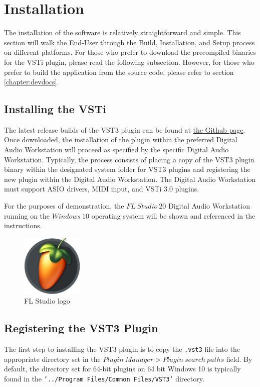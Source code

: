 \documentclass[a4paper,12pt]{report}
\begin{document}
\section{Installation}
\label{sec:installation}
The installation of the software is relatively straightforward and simple. This section will walk the End-User through the Build, Installation, and Setup process on different platforms. For those who prefer to download the precompiled binaries for the VSTi plugin, please read the following subsection. However, for those who prefer to build the application from the source code, please refer to section \ref{chapter:devdocs}.

\subsection{Installing the VSTi}
\label{subsec:installvsti}
The latest release builds of the VST3 plugin can be found at \href{https://github.com/ParadoxChains/C3JI5D-Evan-Sitt-BSc-Thesis/tree/master/Release\%20Builds}{the Github page}. Once downloaded, the installation of the plugin within the preferred Digital Audio Workstation will proceed as specified by the specific Digital Audio Workstation. Typically, the process consists of placing a copy of the VST3 plugin binary within the designated system folder for VST3 plugins and registering the new plugin within the Digital Audio Workstation. The Digital Audio Workstation must support ASIO drivers, MIDI input, and VSTi 3.0 plugins.

For the purposes of demonstration, the $FL\ Studio\ 20$ Digital Audio Workstation running on the $Windows\ 10$ operating system will be shown and referenced in the instructions.

\begin{figure} \centering
\includegraphics[width=8em]{FLStudioLogo.png}
    \caption{FL Studio logo}     \label{fig:FLLogo} \end{figure}

\subsection{Registering the VST3 Plugin}
\label{subsec:registeringvsti}
The first step to installing the VST3 plugin is to copy the \texttt{.vst3} file into the appropriate directory set in the $Plugin\ Manager > Plugin\ search\ paths$ field. By default, the directory set for 64-bit plugins on 64 bit Windows 10 is typically found in the \texttt{'../Program Files/Common Files/VST3'} directory. 
\end{document}
